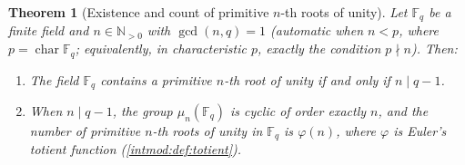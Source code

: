 \documentclass[11pt,a4paper]{article}
\newtheorem{theorem}{Theorem}[section]
\theoremstyle{definition}
\theoremstyle{remark}
\newcommand{\N}{\ensuremath{\mathbb{N}}}
\newcommand{\Fq}{\ensuremath{\mathbb{F}_{q}}}
\DeclareMathOperator{\charf}{char}
\begin{document}
\begin{theorem}[Existence and count of primitive \(n\)-th roots of unity]
\label{rootsofunity:thm-existence}
Let \(\Fq\) be a finite field and \(n \in \N_{>0}\) with
\(\gcd(n, q) = 1\) (automatic when \(n < p\), where
\(p = \charf \Fq\); equivalently, in characteristic \(p\), exactly the
condition \(p \nmid n\)). Then:
\begin{enumerate}
\item The field \(\Fq\) contains a primitive \(n\)-th root of unity if
  and only if \(n \mid q - 1\).
\item When \(n \mid q - 1\), the group \(\mu_n(\Fq)\) is cyclic of order
  exactly \(n\), and the number of primitive \(n\)-th roots of unity in
  \(\Fq\) is \(\varphi(n)\), where \(\varphi\) is Euler's totient
  function (\cref{intmod:def:totient}).
\end{enumerate}
\end{theorem}
\end{document}
